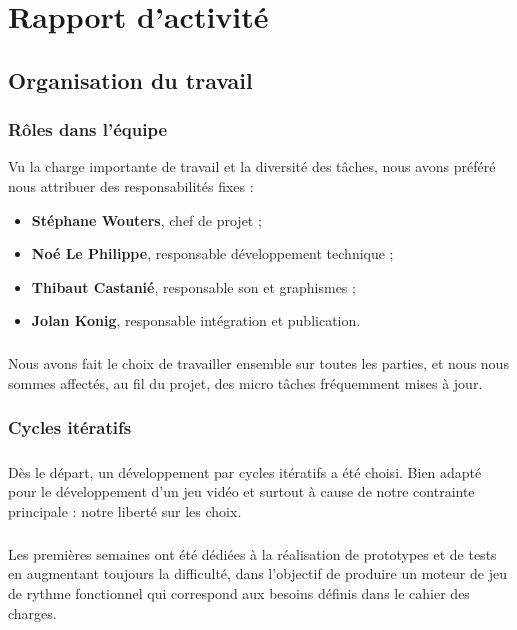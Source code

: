 \chapter{Rapport d'activité}

\section{Organisation du travail}

\subsection{Rôles dans l’équipe}
Vu la charge importante de travail et la diversité des tâches, nous avons préféré nous attribuer des responsabilités fixes :
 
\begin{itemize}
\item \textbf{Stéphane Wouters}, chef de projet ;
\item \textbf{Noé Le Philippe}, responsable développement technique ;
\item \textbf{Thibaut Castanié}, responsable son et graphismes ;
\item \textbf{Jolan Konig}, responsable intégration et publication.
\end{itemize}
 
\paragraph{}
Nous avons fait le choix de travailler ensemble sur toutes les parties, et nous nous sommes affectés, au fil du projet, des micro tâches fréquemment mises à jour.

\subsection{Cycles itératifs}
 
\paragraph{}
Dès le départ, un développement par cycles itératifs a été choisi. Bien adapté pour le développement d’un jeu vidéo et surtout à cause de notre contrainte principale : notre liberté sur les choix.
 
\paragraph{}
Les premières semaines ont été dédiées à la réalisation de prototypes et de tests en augmentant toujours la difficulté, dans l’objectif de produire un moteur de jeu de rythme fonctionnel qui correspond aux besoins définis dans le cahier des charges.
 
